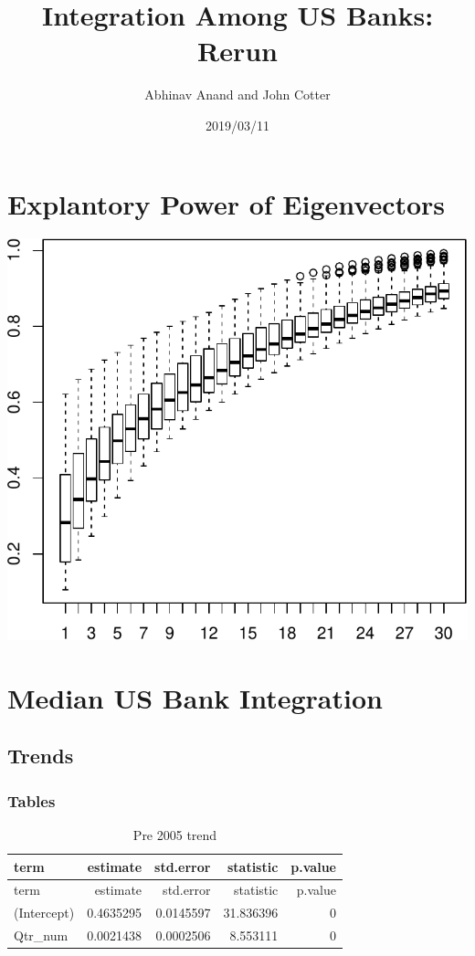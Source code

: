 \documentclass[11pt,]{article}
\title{Integration Among US Banks: Rerun}
\author{Abhinav Anand and John Cotter}
\date{2019/03/11}
\begin{document}
\maketitle

\section{Explantory Power of
Eigenvectors}\label{explantory-power-of-eigenvectors}

\begin{center}\includegraphics{AC_US_Bank_Int_Results_1_files/figure-latex/expl_power_eig_vec-1} \end{center}

\section{Median US Bank Integration}\label{median-us-bank-integration}

\subsection{Trends}\label{trends}

\subsubsection{Tables}\label{tables}

\begin{longtable}[]{@{}lrrrr@{}}
\caption{Pre 2005 trend}\tabularnewline
\toprule
term & estimate & std.error & statistic & p.value\tabularnewline
\midrule
\endfirsthead
\toprule
term & estimate & std.error & statistic & p.value\tabularnewline
\midrule
\endhead
(Intercept) & 0.4635295 & 0.0145597 & 31.836396 & 0\tabularnewline
Qtr\_num & 0.0021438 & 0.0002506 & 8.553111 & 0\tabularnewline
\bottomrule
\end{longtable}
\end{document}
